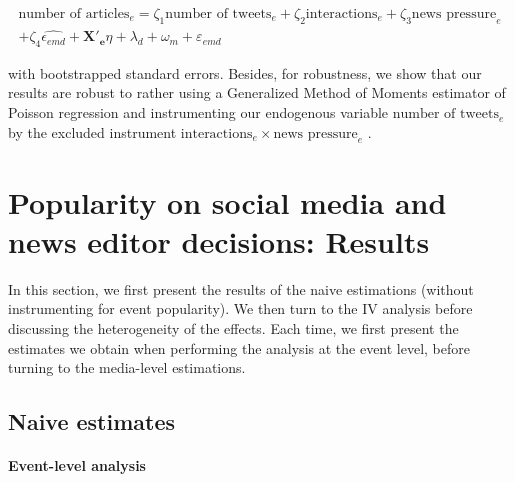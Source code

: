\begin{multline}
\text{number of articles}_{e}= \zeta_{1} \text{number of tweets}_{e} + \zeta_{2} \text{interactions}_{e} + \zeta_{3} \text{news pressure}_{e} \\ 
+ \zeta_{4} \widehat{\epsilon_{emd}} + \mathbf{X'_{e}}\eta + \lambda_d + \omega_m + \varepsilon_{emd}
\label{eq:SecondStageevent}
\end{multline} 

\noindent with bootstrapped standard errors. Besides, for robustness, we show that our results are robust to rather using a Generalized Method of Moments estimator of Poisson regression and instrumenting our endogenous variable $\text{number of tweets}_{e}$ by the excluded instrument $\text{interactions}_{e} \times \text{news pressure}_{e}$ \citep{Nichols2007}.



\section{Popularity on social media and news editor decisions: Results\label{Sec:Results}}

In this section, we first present the results of the naive estimations (without instrumenting for event popularity). We then turn to the IV analysis before discussing the heterogeneity of the effects. Each time, we first present the estimates we obtain when performing the analysis at the event level, before turning to the media-level estimations.


\subsection{Naive estimates}

\paragraph{Event-level analysis}

